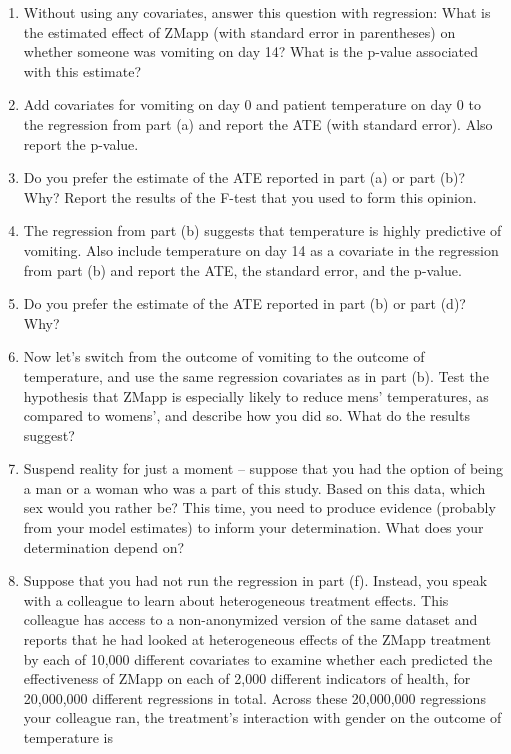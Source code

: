 \documentclass[
]{article}
\begin{document}
\begin{enumerate}
\def\labelenumi{\arabic{enumi}.}
\item
  Without using any covariates, answer this question with regression:
  What is the estimated effect of ZMapp (with standard error in
  parentheses) on whether someone was vomiting on day 14? What is the
  p-value associated with this estimate?
\item
  Add covariates for vomiting on day 0 and patient temperature on day 0
  to the regression from part (a) and report the ATE (with standard
  error). Also report the p-value.
\item
  Do you prefer the estimate of the ATE reported in part (a) or part
  (b)? Why? Report the results of the F-test that you used to form this
  opinion.
\item
  The regression from part (b) suggests that temperature is highly
  predictive of vomiting. Also include temperature on day 14 as a
  covariate in the regression from part (b) and report the ATE, the
  standard error, and the p-value.
\item
  Do you prefer the estimate of the ATE reported in part (b) or part
  (d)? Why?
\item
  Now let's switch from the outcome of vomiting to the outcome of
  temperature, and use the same regression covariates as in part (b).
  Test the hypothesis that ZMapp is especially likely to reduce mens'
  temperatures, as compared to womens', and describe how you did so.
  What do the results suggest?
\item
  Suspend reality for just a moment -- suppose that you had the option
  of being a man or a woman who was a part of this study. Based on this
  data, which sex would you rather be? This time, you need to produce
  evidence (probably from your model estimates) to inform your
  determination. What does your determination depend on?
\item
  Suppose that you had not run the regression in part (f). Instead, you
  speak with a colleague to learn about heterogeneous treatment effects.
  This colleague has access to a non-anonymized version of the same
  dataset and reports that he had looked at heterogeneous effects of the
  ZMapp treatment by each of 10,000 different covariates to examine
  whether each predicted the effectiveness of ZMapp on each of 2,000
  different indicators of health, for 20,000,000 different regressions
  in total. Across these 20,000,000 regressions your colleague ran, the
  treatment's interaction with gender on the outcome of temperature is

\end{enumerate}
\end{document}

